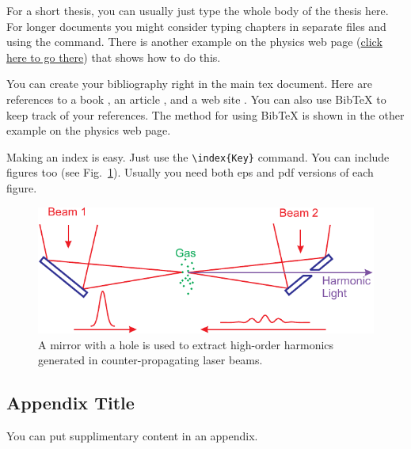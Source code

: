 \documentclass[oneside, astronomy, noacknowlegments]{BYUPhys}
\begin{document}
For a short thesis, you can usually just type the whole body of the
thesis here.  For longer documents you might consider typing
chapters in separate files and using the \verb|| command.
There is another example on the physics web page
(\href{http://www.physics.byu.edu/undergraduate/latex.aspx}{click
here to go there}) that shows how to do this.

You can create your bibliography right in the main tex document.
Here are references to a book \cite{Jackson1998}, an article
\cite{Peatross2000}, and a web site \cite{intel}. You can also use
BibTeX to keep track of your references.  The method for using
BibTeX is shown in the other example on the physics web page.

Making an index is easy. Just use the \verb|\index{Key}| command.
 You can include figures too (see
Fig.~\ref{fig:MirrorDiagram}).  Usually you need both eps and pdf
versions of each figure.
\begin{figure}
    \centerline{\includegraphics{Graphic1}}
    \caption[Setup for using counter-propagating light]{\label{fig:MirrorDiagram}
    A mirror with a hole is used to extract high-order harmonics generated in
    counter-propagating laser beams.}
\end{figure}

\begin{appendices}

\chapter{Appendix Title}
\label{sec:appendixname}

You can put supplimentary content in an appendix.

\end{appendices}

 

 \printindex
\end{document}
